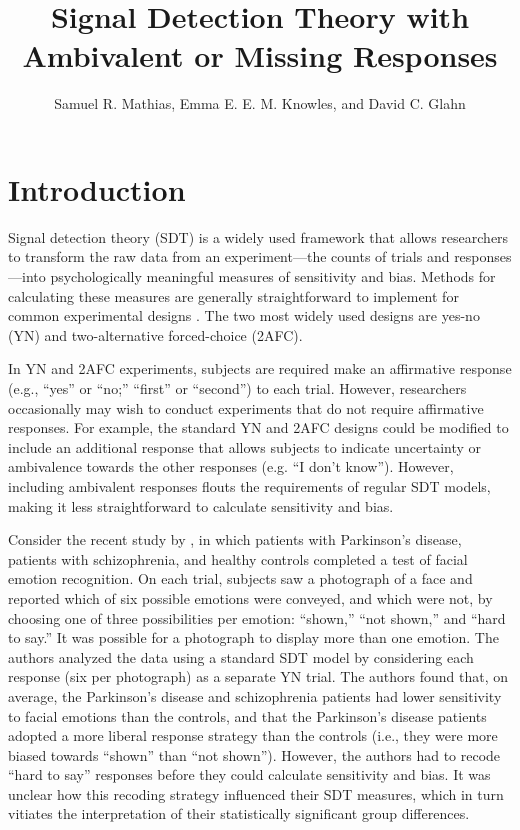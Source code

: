 \documentclass[man]{apa6}
\title{Signal Detection Theory with Ambivalent or Missing Responses}
\author{Samuel R. Mathias, Emma E. E. M. Knowles, and David C. Glahn}
\affiliation{Yale University}
\begin{document}
\maketitle

\section{Introduction}
Signal detection theory (SDT) is a widely used framework that allows researchers to transform the raw data from an experiment---the counts of trials and responses---into psychologically meaningful measures of sensitivity and bias. Methods for calculating these measures are generally straightforward to implement for common experimental designs \parencite[see][]{Green1966, Macmillan2005}. The two most widely used designs are yes-no (YN) and two-alternative forced-choice (2AFC).

In YN and 2AFC experiments, subjects are required make an affirmative response (e.g., ``yes'' or ``no;'' ``first'' or ``second'') to each trial. However, researchers occasionally may wish to conduct experiments that do not require affirmative responses. For example, the standard YN and 2AFC designs could be modified to include an additional response that allows subjects to indicate uncertainty or ambivalence towards the other responses (e.g. ``I don't know''). However, including ambivalent responses flouts the requirements of regular SDT models, making it less straightforward to calculate sensitivity and bias.

Consider the recent study by \textcite{laskowskaemotional2015}, in which patients with Parkinson's disease, patients with schizophrenia, and healthy controls completed a test of facial emotion recognition. On each trial, subjects saw a photograph of a face and reported which of six possible emotions were conveyed, and which were not, by choosing one of three possibilities per emotion: ``shown,'' ``not shown,'' and ``hard to say.'' It was possible for a photograph to display more than one emotion. The authors analyzed the data using a standard SDT model by considering each response (six per photograph) as a separate YN trial. The authors found that, on average, the Parkinson's disease and schizophrenia patients had lower sensitivity to facial emotions than the controls, and that the Parkinson's disease patients adopted a more liberal response strategy than the controls (i.e., they were more biased towards ``shown'' than ``not shown''). However, the authors had to recode ``hard to say'' responses before they could calculate sensitivity and bias. It was unclear how this recoding strategy influenced their SDT measures, which in turn vitiates the interpretation of their statistically significant group differences.
\end{document}
